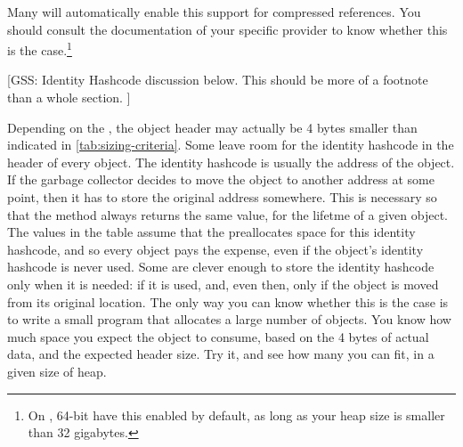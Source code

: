 Many \jres will automatically enable this support for compressed references. You
should consult the documentation of your specific \jre provider to know whether
this is the case.\footnote{On \javaseven, 64-bit
\oracle \jres have this enabled by default, as long as your heap size is smaller
than 32 gigabytes.}




[GSS: Identity Hashcode discussion below.  This should be more of a footnote
than a whole section. ]

Depending on the \jre, the object header may actually be 4 bytes smaller than
indicated in \autoref{tab:sizing-criteria}. Some \jres leave room for the
identity hashcode in the header of every object. The identity hashcode is
usually the address of the object. If the garbage collector decides to move the
object to another address at some point, then it has to store the original
address somewhere. This is necessary so that the  method
always returns the same value, for the lifetme of a given object. The values in
the table assume that the \jre preallocates space for this identity hashcode,
and so every object pays the expense, even if the object's identity hashcode is
never used. Some \jres are clever enough to store the identity hashcode only
when it is needed: if it is used, and, even then, only if the object is moved
from its original location. The only way you can know whether this is the case
is to write a small program that allocates a large number of 
objects. You know how much space you expect the object to consume, based on the
4 bytes of actual data, and the expected header size. Try it, and see how many
you can fit, in a given size of heap.


